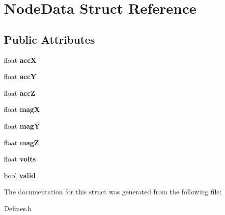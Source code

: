 \hypertarget{structNodeData}{
\section{NodeData Struct Reference}
\label{structNodeData}
}
\subsection*{Public Attributes}
\begin{DoxyCompactItemize}
\item 
\hypertarget{structNodeData_ac223d38b9dba2817057adc7c3a41bce9}{
float {\bfseries accX}}
\label{structNodeData_ac223d38b9dba2817057adc7c3a41bce9}

\item 
\hypertarget{structNodeData_ae448efdff89ae766a3e18a9df6ad23f5}{
float {\bfseries accY}}
\label{structNodeData_ae448efdff89ae766a3e18a9df6ad23f5}

\item 
\hypertarget{structNodeData_aa200421c0824b0120a35394143bac5ce}{
float {\bfseries accZ}}
\label{structNodeData_aa200421c0824b0120a35394143bac5ce}

\item 
\hypertarget{structNodeData_aec218c69255eb692ff41049c507cf08d}{
float {\bfseries magX}}
\label{structNodeData_aec218c69255eb692ff41049c507cf08d}

\item 
\hypertarget{structNodeData_a2028552722bfa03682999db9c79b199e}{
float {\bfseries magY}}
\label{structNodeData_a2028552722bfa03682999db9c79b199e}

\item 
\hypertarget{structNodeData_ab134ba2060337c908d2bd6fdb7c132ff}{
float {\bfseries magZ}}
\label{structNodeData_ab134ba2060337c908d2bd6fdb7c132ff}

\item 
\hypertarget{structNodeData_a87552f3659f4d64e1ddb07bc03b7a36f}{
float {\bfseries volts}}
\label{structNodeData_a87552f3659f4d64e1ddb07bc03b7a36f}

\item 
\hypertarget{structNodeData_aa90953affd189f1c02295c12cec5f3ba}{
bool {\bfseries valid}}
\label{structNodeData_aa90953affd189f1c02295c12cec5f3ba}

\end{DoxyCompactItemize}


The documentation for this struct was generated from the following file:\begin{DoxyCompactItemize}
\item 
Defines.h\end{DoxyCompactItemize}
